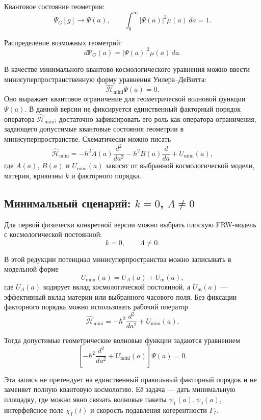 \documentclass[12pt,a4paper]{article}
\newcommand{\Prob}{\mathbb P}
\begin{document}
Квантовое состояние геометрии:
\[
\boxed{
\Psi_G[g]
\longrightarrow
\Psi(a),
\qquad
\int_0^\infty |\Psi(a)|^2\mu(a)\,da=1.
}
\]

Распределение возможных геометрий:
\[
\boxed{
d\Prob_G(a)=|\Psi(a)|^2\mu(a)\,da.
}
\]


В качестве минимального квантово-космологического уравнения можно ввести минисуперпространственную форму уравнения Уилера--ДеВитта:
\[
\boxed{
\widehat{\mathcal H}_{\mathrm{mini}}\Psi(a)=0.
}
\]
Оно выражает квантовое ограничение для геометрической волновой функции $\Psi(a)$. В данной версии не фиксируется единственный факторный порядок оператора $\widehat{\mathcal H}_{\mathrm{mini}}$; достаточно зафиксировать его роль как оператора ограничения, задающего допустимые квантовые состояния геометрии в минисуперпространстве. Схематически можно писать
\[
\boxed{
\widehat{\mathcal H}_{\mathrm{mini}}
=
-\hbar^2 A(a)\frac{d^2}{da^2}
-\hbar^2 B(a)\frac{d}{da}
+U_{\mathrm{mini}}(a),
}
\]
где $A(a)$, $B(a)$ и $U_{\mathrm{mini}}(a)$ зависят от выбранной космологической модели, материи, кривизны $k$ и факторного порядка.


\subsection{Минимальный сценарий: \texorpdfstring{$k=0$, $\Lambda\neq0$}{k=0, Lambda nonzero}}

Для первой физически конкретной версии можно выбрать плоскую FRW-модель с космологической постоянной:
\[
\boxed{
k=0,
\qquad
\Lambda\neq0.
}
\]

В этой редукции потенциал минисуперпространства можно записывать в модельной форме
\[
\boxed{
U_{\mathrm{mini}}(a)
=
U_\Lambda(a)+U_{\mathrm{m}}(a),
}
\]
где $U_\Lambda(a)$ кодирует вклад космологической постоянной, а $U_{\mathrm{m}}(a)$ --- эффективный вклад материи или выбранного часового поля. Без фиксации факторного порядка можно использовать рабочий оператор
\[
\boxed{
\widehat{\mathcal H}_{\mathrm{mini}}
=
-\hbar^2\frac{d^2}{da^2}
+U_{\mathrm{mini}}(a).
}
\]

Тогда допустимые геометрические волновые функции задаются уравнением
\[
\boxed{
\left[-\hbar^2\frac{d^2}{da^2}+U_{\mathrm{mini}}(a)\right]\Psi(a)=0.
}
\]

Эта запись не претендует на единственный правильный факторный порядок и не заменяет полную квантовую космологию. Её задача --- дать минимальную площадку, где можно явно связать волновые пакеты $\psi_1(a),\psi_2(a)$, интерфейсное поле $\chi_I(t)$ и скорость подавления когерентности $\Gamma_I$.
\end{document}
